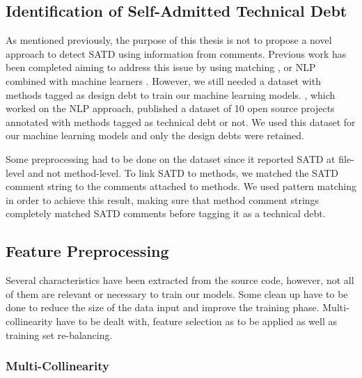 \subsection{Identification of Self-Admitted Technical Debt}


As mentioned previously, the purpose of this thesis is not to propose a novel approach to detect \ac{SATD} using information from comments. Previous work has been completed aiming to address this issue by using  matching \citep{MaldonadoS15}, \citep{PotdarS14} or \ac{NLP} combined with machine learners \citep{maldonado17}. However, we still needed a dataset with methods tagged as design debt to train our machine learning models. \citet{maldonado17}, which worked on the \ac{NLP} approach, published a dataset of 10 open source projects annotated with methods tagged as technical debt or not. We used this dataset for our machine learning models and only the design debts were retained. \par

Some preprocessing had to be done on the dataset since it reported \ac{SATD} at file-level and not method-level. To link \ac{SATD} to methods, we matched the \ac{SATD} comment string to the comments attached to methods. We used pattern matching in order to achieve this result, making sure that method comment strings completely matched \ac{SATD} comments before tagging it as a technical debt.

\subsection{Feature Preprocessing}


Several characteristics have been extracted from the source code, however, not all of them are relevant or necessary to train our models. Some clean up have to be done to reduce the size of the data input and improve the training phase. Multi-collinearity have to be dealt with, feature selection as to be applied as well as training set re-balancing.

\subsubsection{Multi-Collinearity}


